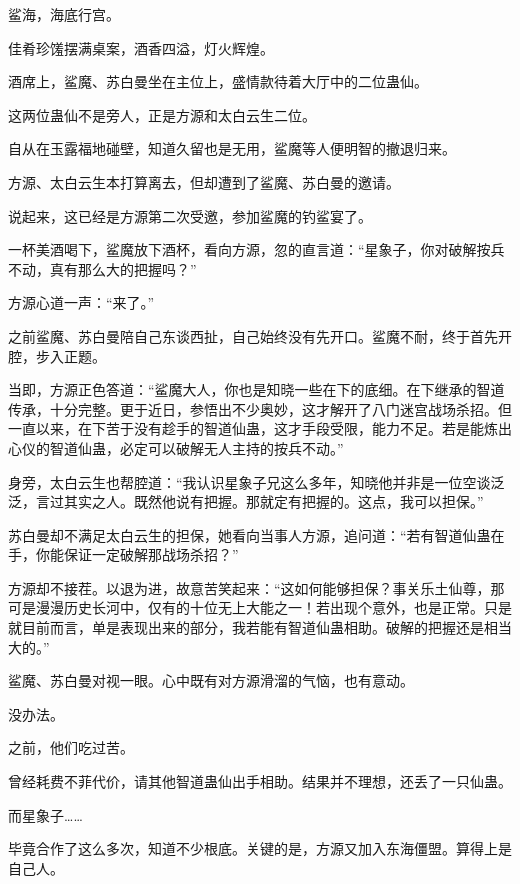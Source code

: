
\begin{this_body}

鲨海，海底行宫。

佳肴珍馐摆满桌案，酒香四溢，灯火辉煌。

酒席上，鲨魔、苏白曼坐在主位上，盛情款待着大厅中的二位蛊仙。

这两位蛊仙不是旁人，正是方源和太白云生二位。

自从在玉露福地碰壁，知道久留也是无用，鲨魔等人便明智的撤退归来。

方源、太白云生本打算离去，但却遭到了鲨魔、苏白曼的邀请。

说起来，这已经是方源第二次受邀，参加鲨魔的钓鲨宴了。

一杯美酒喝下，鲨魔放下酒杯，看向方源，忽的直言道：“星象子，你对破解按兵不动，真有那么大的把握吗？”

方源心道一声：“来了。”

之前鲨魔、苏白曼陪自己东谈西扯，自己始终没有先开口。鲨魔不耐，终于首先开腔，步入正题。

当即，方源正色答道：“鲨魔大人，你也是知晓一些在下的底细。在下继承的智道传承，十分完整。更于近日，参悟出不少奥妙，这才解开了八门迷宫战场杀招。但一直以来，在下苦于没有趁手的智道仙蛊，这才手段受限，能力不足。若是能炼出心仪的智道仙蛊，必定可以破解无人主持的按兵不动。”

身旁，太白云生也帮腔道：“我认识星象子兄这么多年，知晓他并非是一位空谈泛泛，言过其实之人。既然他说有把握。那就定有把握的。这点，我可以担保。”

苏白曼却不满足太白云生的担保，她看向当事人方源，追问道：“若有智道仙蛊在手，你能保证一定破解那战场杀招？”

方源却不接茬。以退为进，故意苦笑起来：“这如何能够担保？事关乐土仙尊，那可是漫漫历史长河中，仅有的十位无上大能之一！若出现个意外，也是正常。只是就目前而言，单是表现出来的部分，我若能有智道仙蛊相助。破解的把握还是相当大的。”

鲨魔、苏白曼对视一眼。心中既有对方源滑溜的气恼，也有意动。

没办法。

之前，他们吃过苦。

曾经耗费不菲代价，请其他智道蛊仙出手相助。结果并不理想，还丢了一只仙蛊。

而星象子……

毕竟合作了这么多次，知道不少根底。关键的是，方源又加入东海僵盟。算得上是自己人。


\end{this_body}
